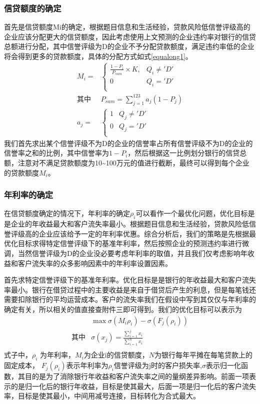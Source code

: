 \documentclass{cumcmthesis}
\begin{document}
\subsubsection{信贷额度的确定}
首先是信贷额度Mi的确定，根据题目信息和生活经验，贷款风险低信誉评级高的企业应该分配更大的信贷额度，因此考虑使用上文预测的企业违约率对银行的信贷总额进行分配，其中信誉评级为D的企业不予分配贷款额度，满足违约率低的企业将会得到更多的贷款额度，具体的分配方式如式\ref{equalong1}。
\begin{equation}
\begin{split}
M_i=&
\begin{cases}
\frac{1-P_i}{P_{sum}}\times K, & Q_i \ne 'D'\\
0 & Q_i = 'D' \\
\end{cases} \\
\mbox{其中} &  P_{sum} = \sum_{j=1}^{123} a_j (1-P_j) \\
 a_j =& 
\begin{cases}
1 & Q_j \ne 'D' \\
0 & Q_j = 'D'\\
\end{cases}
\end{split}
\label{equalong1}
\end{equation}
我们首先求出某个信誉评级不为D的企业的信誉率占所有信誉评级不为D的企业的信誉率之和的比例，其中信誉率为$1-P_i$，然后根据这一比例划分银行的信贷总额，注意对不满足贷款额度为10\textasciitilde 100万元的值进行截断，最终可以得到每个企业的贷款额度$M_i$。
\subsubsection{年利率的确定}
在信贷额度确定的情况下，年利率的确定$\rho_i$可以看作一个最优化问题，优化目标是是企业的年收益最大和客户流失率最小。根据题目信息和生活经验，贷款风险低信誉评级高的企业应该给予一定的年利率优惠。综合分析后，我们的策略是先根据最优化目标求得特定信誉评级下的基准年利率，然后按照企业的预测违约率进行微调，当然信誉评级为D的企业没必要考虑年利率的取值，并且我们仅考虑影响年收益和客户流失率的众多影响因素中的年利率设置因素。


首先求特定信誉评级下的基准年利率。优化目标是是银行的年收益最大和客户流失率最小。银行在借贷过程中的主要收益是来自于借贷后产生的利息，但是每笔钱还需要扣除银行的平均运营成本。客户的流失率我们在假设中写到其仅仅与年利率的确定有关，所以相关的值直接查附件三即可得到。我们的优化目标可以表示为
\begin{equation}
    \begin{split}
    & \max \sigma(M_i \rho_i) - \sigma(F_j(\rho_i))
    \\
    \mbox{其中} &  \sigma(x_j) = \frac{\sum_{i=1}^{j}x_i}{\sum_{i=1}^{n}x_i} \\
    \end{split}
    \label{equalong2}
\end{equation}
式子中，$\rho_i$ 为年利率，$M_i$为企业i的信贷额度，$N$为银行每年平摊在每笔贷款上的固定成本，
$F_j(\rho_i)$表示年利率为$\rho_i$信誉评级为j时的客户损失率,$\sigma$表示归一化函数，其目的是为了消除银行年收益和客户流失率之间的量纲差异影响。前面一项表示的是归一化后的银行年收益，目标是使其最大，后面一项是归一化后的客户流失率，目标是使其最小，中间用减号连接，目标转化为合式最大。
\end{document}
